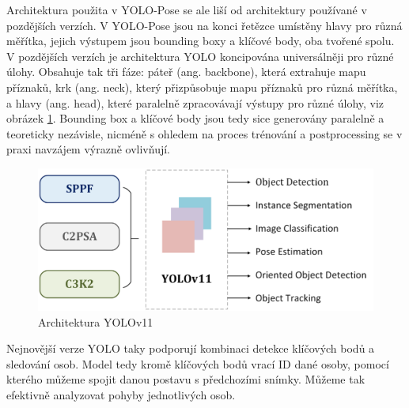 Architektura použita v YOLO-Pose se ale liší od architektury používané v
pozdějších verzích. V YOLO-Pose jsou na konci řetězce umístěny hlavy pro různá
měřítka, jejich výstupem jsou bounding boxy a klíčové body, oba tvořené spolu.
V pozdějších verzích je architektura YOLO koncipována universálněji pro různé
úlohy. Obsahuje tak tři fáze: páteř (ang. backbone), která extrahuje mapu
příznaků, krk (ang. neck), který přizpůsobuje mapu příznaků pro různá měřítka,
a hlavy (ang. head), které paralelně zpracovávají výstupy pro různé úlohy, viz
obrázek \ref{fig:yolov11}. \cite{yolov11} Bounding box a klíčové body jsou tedy
sice generovány paralelně a teoreticky nezávisle, nicméně s ohledem na proces
trénování a postprocessing se v praxi navzájem výrazně ovlivňují.

\begin{figure}[]
    \centering
    \includegraphics[height=0.2\textheight]{Figures/yolo_v11.png}
    \caption{Architektura YOLOv11 \cite{yolov11}}
    \label{fig:yolov11}
\end{figure}

Nejnovější verze YOLO taky podporují kombinaci detekce klíčových bodů a
sledování osob. Model tedy kromě klíčových bodů vrací ID dané osoby, pomocí
kterého můžeme spojit danou postavu s předchozími snímky. Můžeme tak efektivně
analyzovat pohyby jednotlivých osob.


\endinput